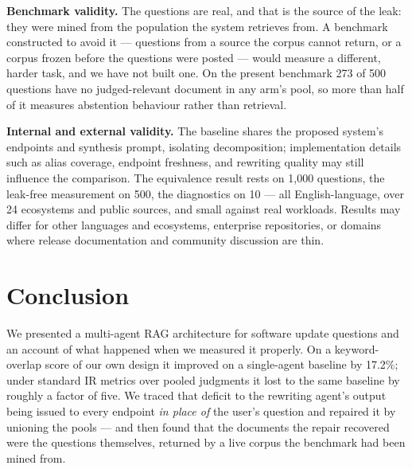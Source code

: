 \documentclass[10pt,conference]{IEEEtran}
\begin{document}
\textbf{Benchmark validity.} The questions are real, and that is the source of the
leak: they were mined from the population the system retrieves from. A benchmark
constructed to avoid it --- questions from a source the corpus cannot return, or a
corpus frozen before the questions were posted --- would measure a different,
harder task, and we have not built one. On the present benchmark 273 of 500
questions have no judged-relevant document in any arm's pool, so more than half of
it measures abstention behaviour rather than retrieval.

\textbf{Internal and external validity.} The baseline shares the proposed system's
endpoints and synthesis prompt, isolating decomposition; implementation details
such as alias coverage, endpoint freshness, and rewriting quality may still
influence the comparison. The equivalence result rests on 1{,}000 questions, the
leak-free measurement on 500, the diagnostics on 10 --- all English-language, over
24 ecosystems and public sources, and small against real workloads. Results may
differ for other languages and ecosystems, enterprise repositories, or domains
where release documentation and community discussion are thin.

\section{Conclusion}

We presented a multi-agent RAG architecture for software update questions and an
account of what happened when we measured it properly. On a keyword-overlap score
of our own design it improved on a single-agent baseline by 17.2\%; under standard
IR metrics over pooled judgments it lost to the same baseline by roughly a factor
of five. We traced that deficit to the rewriting agent's output being issued to
every endpoint \emph{in place of} the user's question and repaired it by unioning
the pools --- and then found that the documents the repair recovered were the
questions themselves, returned by a live corpus the benchmark had been mined from.
\end{document}
